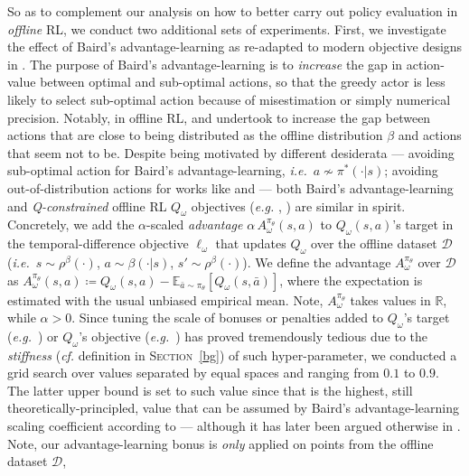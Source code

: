 So as to complement our analysis on how to better carry out policy evaluation in \emph{offline} RL,
we conduct two additional sets of experiments.
First, we investigate the effect of Baird's advantage-learning \cite{Baird1993-qa, Baird1999-dq}
as re-adapted to modern objective designs in \cite{Bellemare2015-ii}.
The purpose of Baird's advantage-learning is to \emph{increase} the gap in action-value
between optimal and sub-optimal actions, so that the greedy actor is less likely to select sub-optimal action
because of misestimation or simply numerical precision.
Notably, in offline RL, \cite{Wu2019-nl} and \cite{Kumar2020-zb}
undertook to increase the gap between actions that are close to
being distributed as the offline distribution $\beta$ and actions that seem not to be.
Despite being motivated by different desiderata --- avoiding sub-optimal action for Baird's advantage-learning,
\textit{i.e.}~$a \nsim \pi^*(\cdot | s)$;
avoiding out-of-distribution actions for works like \cite{Wu2019-nl} and \cite{Kumar2020-zb} ---
both Baird's advantage-learning
and \textit{Q-constrained} offline RL $Q_\omega$ objectives
(\textit{e.g.} \cite{Wu2019-nl}, \cite{Kumar2020-zb})
are similar in spirit.
Concretely, we add the $\alpha$-scaled \emph{advantage}
$\alpha \, A^{\pi_\theta}_\omega(s,a)$ to $Q_\omega(s,a)$'s target
in the temporal-difference objective $\ell_\omega$
that updates $Q_\omega$ over the offline dataset $\mathcal{D}$
\big(\textit{i.e.}~$s \sim \rho^\beta(\cdot)$, $a \sim \beta(\cdot | s)$, $s' \sim \rho^\beta(\cdot)$\big).
We define the advantage $A^{\pi_\theta}_\omega$ over $\mathcal{D}$ as
$A^{\pi_\theta}_\omega(s,a) \coloneqq Q_\omega(s,a) -
\mathbb{E}_{\bar{a} \sim \pi_\theta}[Q_\omega(s,\bar{a})]$,
where the expectation is estimated with the usual unbiased empirical mean.
Note, $A^{\pi_\theta}_\omega$ takes values in $\mathbb{R}$, while $\alpha > 0$.
Since tuning the scale of bonuses or penalties added to $Q_\omega$'s target (\textit{e.g.}~\cite{Wu2019-nl})
or $Q_\omega$'s objective (\textit{e.g.}~\cite{Kumar2020-zb})
has proved tremendously tedious due to the \emph{stiffness} (\textit{cf.} definition in \textsc{Section}~\ref{bg})
of such hyper-parameter,
we conducted a grid search over values separated by equal spaces and ranging from $0.1$ to $0.9$.
The latter upper bound is set to such value
since that is the highest, still theoretically-principled, value that
can be assumed by Baird's advantage-learning scaling coefficient according to \cite{Bellemare2015-ii}
--- although it has later been argued otherwise in \cite{Lu2019-tp}.
Note, our advantage-learning bonus is \emph{only} applied on points from the offline dataset $\mathcal{D}$,

